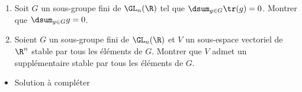 \begin{enonce}
\begin{exercise}[ID={RMS134 E572},subtitle={Oral
    Mines-Ponts},theme={algebre},annee={2023},concours={mines-ponts},filiere={MP}] 
  \begin{enumerate}
  \item Soit $G$ un sous-groupe fini de $\GL_n(\R)$ tel que
    $\dsum_{g\in G}\tr(g)=0$. Montrer que $\dsum_{g\in G}g=0$.
  \item Soient $G$ un sous-groupe fini de $\GL_n(\R)$ et $V$ un
    sous-espace vectoriel de $\R^n$ stable par tous les éléments de
    $G$. Montrer que $V$ admet un supplémentaire stable par tous les
    éléments de $G$.
  \end{enumerate}
\end{exercise}
\begin{solution}
  \begin{itemize}
  \item Solution à compléter
  \end{itemize}
\end{solution}
\end{enonce}